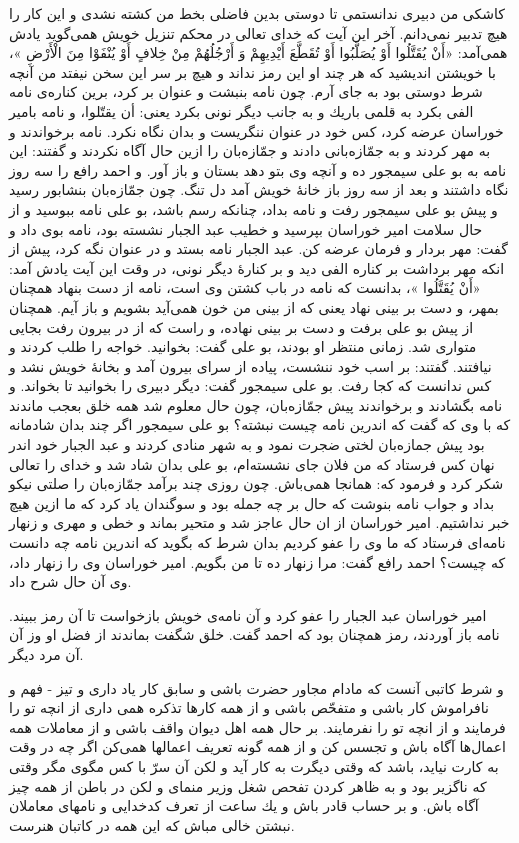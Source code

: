 كاشكى من دبيرى ندانستمى تا دوستى بدين فاضلى بخط من كشته نشدى و اين كار را هيچ تدبير نمى‌دانم. آخر اين آيت كه خداى تعالى در محكم تنزيل خويش همى‌گويد يادش همى‌آمد: «أَنْ يُقَتَّلُوا أَوْ يُصَلَّبُوا أَوْ تُقَطَّعَ أَيْدِيهِمْ وَ أَرْجُلُهُمْ مِنْ خِلافٍ أَوْ يُنْفَوْا مِنَ الْأَرْضِ »، با خويشتن انديشيد كه هر چند او اين رمز نداند و هيچ بر سر اين سخن نيفتد من آنچه شرط دوستى بود به جاى آرم. چون نامه بنبشت و عنوان بر كرد، برين كناره‌ی نامه الفى بكرد به قلمى باريك و به جانب ديگر نونى بكرد يعنى: أن يقتّلوا، و نامه بامير خوراسان عرضه كرد، كس خود در عنوان ننگريست و بدان نگاه نكرد. نامه برخواندند و به مهر كردند و به جمّازه‌بانى دادند و جمّازه‌بان را ازين حال آگاه نكردند و گفتند: اين نامه به بو على سيمجور ده و آنچه وى بتو دهد بستان و باز آور. و احمد رافع را سه روز نگاه داشتند و بعد از سه روز باز خانۀ خويش آمد دل تنگ. چون جمّازه‌بان بنشابور رسيد و پيش بو على سيمجور رفت و نامه بداد، چنانكه رسم باشد، بو على نامه ببوسيد و از حال سلامت امير خوراسان بپرسيد و خطيب عبد الجبار نشسته بود، نامه بوى داد و گفت: مهر بردار و فرمان عرضه كن. عبد الجبار نامه بستد و در عنوان نگه كرد، پيش از انكه مهر برداشت بر كناره الفى ديد و بر كنارۀ ديگر نونى، در وقت اين آيت يادش آمد: «أَنْ يُقَتَّلُوا »، بدانست كه نامه در باب كشتن وى است، نامه از دست بنهاد همچنان بمهر، و دست بر بينى نهاد يعنى كه از بينى من خون همى‌آيد بشويم و باز آيم. همچنان از پيش بو على برفت و دست بر بينى نهاده، و راست كه از در بيرون رفت بجايى متوارى شد. زمانى منتظر او بودند، بو على گفت: بخوانيد. خواجه را طلب كردند و نيافتند. گفتند: بر اسب خود ننشست، پياده از سراى بيرون آمد و بخانۀ خويش نشد و كس ندانست كه كجا رفت. بو على سيمجور گفت: ديگر دبيرى را بخوانيد تا بخواند. و نامه بگشادند و برخواندند پيش جمّازه‌بان، چون حال معلوم شد همه خلق بعجب ماندند كه با وى كه گفت كه اندرين نامه چيست نبشته‌؟ بو على سيمجور اگر چند بدان شادمانه بود پيش جمازه‌بان لختى ضجرت نمود و به شهر منادى كردند و عبد الجبار خود اندر نهان كس فرستاد كه من فلان جاى نشسته‌ام، بو على بدان شاد شد و خداى را تعالى شكر كرد و فرمود كه: همانجا همى‌باش. چون روزى چند برآمد جمّازه‌بان را صلتى نيكو بداد و جواب نامه بنوشت كه حال بر چه جمله بود و سوگندان ياد كرد كه ما ازين هيچ خبر نداشتيم. امير خوراسان از ان حال عاجز شد و متحير بماند و خطى و مهرى و زنهار نامه‌اى فرستاد كه ما وى را عفو كرديم بدان شرط كه بگويد كه اندرين نامه چه دانست كه چيست‌؟ احمد رافع گفت: مرا زنهار ده تا من بگويم. امير خوراسان وى را زنهار داد، وى آن حال شرح داد.

امير خوراسان عبد الجبار را عفو كرد و آن نامه‌ی خويش بازخواست تا آن رمز ببيند. نامه باز آوردند، رمز همچنان بود كه احمد گفت. خلق شگفت بماندند از فضل او وز آن آن مرد ديگر.

و شرط كاتبى آنست كه مادام مجاور حضرت باشى و سابق كار ياد دارى و تيز - فهم و نافراموش كار باشى و متفحّص باشى و از همه كارها تذكره همى دارى از انچه تو را فرمايند و از انچه تو را نفرمايند. بر حال همه اهل ديوان واقف باشى و از معاملات همه اعما‌ل‌ها آگاه باش و تجسس كن و از همه گونه تعريف اعمالها همى‌كن اگر چه در وقت به كارت نيايد، باشد كه وقتى ديگرت به كار آيد و لكن آن سرّ با كس مگوى مگر وقتى كه ناگزير بود و به ظاهر كردن تفحص شغل وزير منماى و لكن در باطن از همه چيز آگاه باش. و بر حساب قادر باش و يك ساعت از تعرف كدخدايى و نامهاى معاملان نبشتن خالى مباش كه اين همه در كاتبان هنرست.


